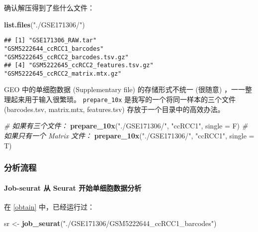 \documentclass[
]{article}
\newenvironment{Shaded}{\begin{snugshade}}{\end{snugshade}}
\newcommand{\CommentTok}[1]{\textcolor[rgb]{0.56,0.35,0.01}{\textit{#1}}}
\newcommand{\DataTypeTok}[1]{\textcolor[rgb]{0.13,0.29,0.53}{#1}}
\newcommand{\KeywordTok}[1]{\textcolor[rgb]{0.13,0.29,0.53}{\textbf{#1}}}
\newcommand{\NormalTok}[1]{#1}
\newcommand{\StringTok}[1]{\textcolor[rgb]{0.31,0.60,0.02}{#1}}
\begin{document}
确认解压得到了些什么文件：

\begin{Shaded}
\begin{Highlighting}[]
\KeywordTok{list.files}\NormalTok{(}\StringTok{"./GSE171306/"}\NormalTok{)}
\end{Highlighting}
\end{Shaded}

\begin{verbatim}
## [1] "GSE171306_RAW.tar"                 "GSM5222644_ccRCC1_barcodes"        "GSM5222645_ccRCC2_barcodes.tsv.gz"
## [4] "GSM5222645_ccRCC2_features.tsv.gz" "GSM5222645_ccRCC2_matrix.mtx.gz"
\end{verbatim}

GEO 中的单细胞数据 (Supplementary file) 的存储形式不统一 (很随意) ，一一整理起来用于输入很繁琐。
\texttt{prepare\_10x} 是我写的一个将同一样本的三个文件 (barcodes.tsv, matrix.mtx, features.tsv) 存放于一个目录中的高效办法。

\begin{Shaded}
\begin{Highlighting}[]
\CommentTok{\# 如果有三个文件：}
\KeywordTok{prepare\_10x}\NormalTok{(}\StringTok{"./GSE171306/"}\NormalTok{, }\StringTok{"ccRCC1"}\NormalTok{, }\DataTypeTok{single =}\NormalTok{ F)}
\CommentTok{\# 如果只有一个 Matrix 文件：}
\KeywordTok{prepare\_10x}\NormalTok{(}\StringTok{"./GSE171306/"}\NormalTok{, }\StringTok{"ccRCC1"}\NormalTok{, }\DataTypeTok{single =}\NormalTok{ T)}
\end{Highlighting}
\end{Shaded}

\hypertarget{ux5206ux6790ux6d41ux7a0b}{%
\subsubsection{分析流程}\label{ux5206ux6790ux6d41ux7a0b}}

\hypertarget{job-seurat-ux4ece-seurat-ux5f00ux59cbux5355ux7ec6ux80deux6570ux636eux5206ux6790}{%
\paragraph{Job-seurat 从 Seurat 开始单细胞数据分析}\label{job-seurat-ux4ece-seurat-ux5f00ux59cbux5355ux7ec6ux80deux6570ux636eux5206ux6790}}

在 \ref{obtain} 中，已经运行过：

\begin{Shaded}
\begin{Highlighting}[]
\NormalTok{sr \textless{}{-}}\StringTok{ }\KeywordTok{job\_seurat}\NormalTok{(}\StringTok{"./GSE171306/GSM5222644\_ccRCC1\_barcodes"}\NormalTok{)}
\end{Highlighting}
\end{Shaded}
\end{document}
